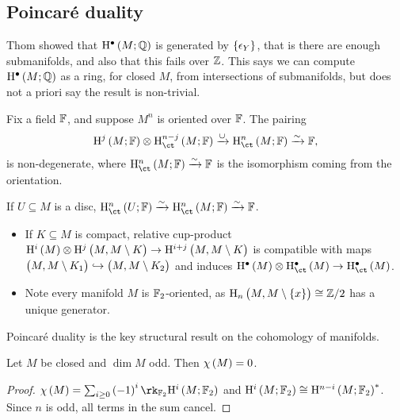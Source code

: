 \subsection{Poincar\'e duality}


Thom showed that $ \H^\bullet\br{M; \QQ} $ is generated by $ \cbr{\epsilon_Y} $, that is there are enough submanifolds, and also that this fails over $ \mathbb{Z} $. This says we can compute $ \H^\bullet\br{M; \QQ} $ as a ring, for closed $ M $, from intersections of submanifolds, but does not a priori say the result is non-trivial.

\begin{theorem}
Fix a field $ \mathbb{F} $, and suppose $ M^n $ is oriented over $ \mathbb{F} $. The pairing
$$ \H^j\br{M; \FF} \otimes \Hc^{n - j}\br{M; \FF} \xrightarrow{\cup} \Hc^n\br{M; \FF} \xrightarrow{\sim} \FF, $$
is non-degenerate, where $ \Hc^n\br{M; \FF} \xrightarrow{\sim} \FF $ is the isomorphism coming from the orientation.
\end{theorem}

If $ U \subseteq M $ is a disc, $ \Hc^n\br{U; \FF} \xrightarrow{\sim} \Hc^n\br{M; \FF} \xrightarrow{\sim} \FF $.

\begin{remark*}
\hfill
\begin{itemize}
\item If $ K \subseteq M $ is compact, relative cup-product $ \H^i\br{M} \otimes \H^j\br{M, M \setminus K} \to \H^{i + j}\br{M, M \setminus K} $ is compatible with maps $ \br{M, M \setminus K_1} \hookrightarrow \br{M, M \setminus K_2} $ and induces $ \H^\bullet\br{M} \otimes \Hc^\bullet\br{M} \to \Hc^\bullet\br{M} $.
\item Note every manifold $ M $ is $ \mathbb{F}_2 $-oriented, as $ \H_n\br{M, M \setminus \cbr{x}} \cong \ZZ / 2 $ has a unique generator.
\end{itemize}
\end{remark*}

Poincar\'e duality is the key structural result on the cohomology of manifolds.

\begin{corollary}
Let $ M $ be closed and $ \dim M $ odd. Then $ \chi\br{M} = 0 $.
\end{corollary}

\begin{proof}
$ \chi\br{M} = \sum_{i \ge 0} \br{-1}^i \rk_{\FF_2} \H^i\br{M; \FF_2} $ and $ \H^i\br{M; \FF_2} \cong \H^{n - i}\br{M; \FF_2}^* $. Since $ n $ is odd, all terms in the sum cancel.
\end{proof}


